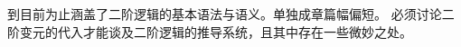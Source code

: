 \documentclass[../../../include/open-logic-chapter]{subfiles}
\begin{document}

\begin{editorial}
到目前为止涵盖了二阶逻辑的基本语法与语义。单独成章篇幅偏短。
必须讨论二阶变元的代入才能谈及二阶逻辑的推导系统，且其中存在一些微妙之处。
\end{editorial}







\OLEndChapterHook
\end{document}
